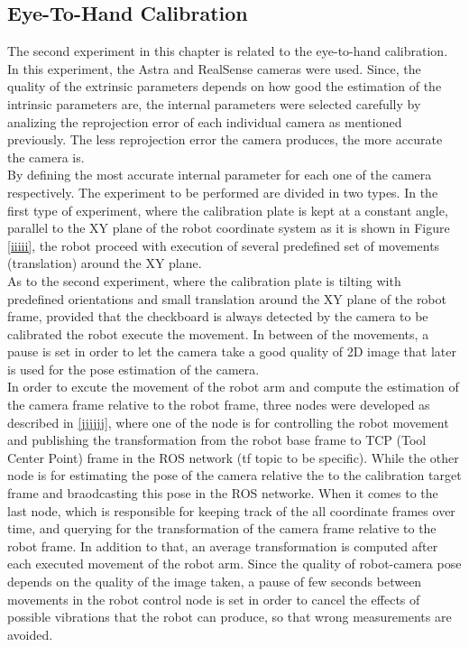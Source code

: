 \subsection{Eye-To-Hand Calibration}
The second experiment in this chapter is related to the eye-to-hand calibration. In this experiment, the Astra and RealSense cameras were used. Since, the quality of the extrinsic parameters depends on how good the estimation of the intrinsic parameters are, the internal parameters were selected carefully by analizing the reprojection error of each individual camera as mentioned previously. The less reprojection error the camera produces, the more accurate the camera is. \\
By defining the most accurate internal parameter for each one of the camera respectively. The experiment to be performed are divided in two types.
In the first type of experiment, where the calibration plate is kept at a constant angle, parallel to the XY plane of the robot coordinate system as it is shown in Figure \ref{iiiii}, the robot proceed with execution of several predefined set of movements (translation) around the XY plane.\\ 
As to the second experiment, where the calibration plate is   tilting with predefined orientations and small translation around the XY plane of the robot frame, provided that the checkboard is always detected by the camera to be calibrated the robot execute the movement. In between of the movements, a pause is set in order to let the camera take a good quality of 2D image that later is used for the pose estimation of the camera.\\

In order to excute the movement of the robot arm and compute the estimation of the camera frame relative to the robot frame, three nodes were developed as described in \ref{jjjjjj}, where one of the node is for controlling the robot movement and publishing the transformation from the robot base frame to TCP (Tool Center Point) frame in the ROS network (tf topic to be specific). While the other node is for estimating the pose of the camera relative the to the calibration target frame and braodcasting this pose in the ROS networke. When it comes to the last node, which is responsible for keeping track of the all coordinate frames over time, and querying for the transformation of the camera frame relative to the robot frame. In addition to that, an average transformation is computed after each executed movement of the robot arm. Since the quality of robot-camera pose depends on the quality of the image taken, a pause of few seconds between movements in the robot control node is set in order to cancel the effects of possible vibrations that the robot can produce, so that wrong measurements are avoided.



